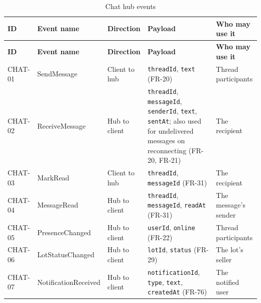 {\small
\begin{longtable}{@{}>{\raggedright\arraybackslash}p{}>{\raggedright\arraybackslash}p{}>{\raggedright\arraybackslash}p{}>{\raggedright\arraybackslash}p{}>{\raggedright\arraybackslash}p{}@{}}
\caption{Chat hub events}\label{tab:chat-hub-events}\\
\toprule
\textbf{ID} & \textbf{Event name} & \textbf{Direction} & \textbf{Payload} & \textbf{Who may use it} \\
\midrule
\endfirsthead
\toprule
\textbf{ID} & \textbf{Event name} & \textbf{Direction} & \textbf{Payload} & \textbf{Who may use it} \\
\midrule
\endhead
CHAT-01 & SendMessage & Client to hub & \texttt{threadId}, \texttt{text} (FR-20) & Thread participants \\
CHAT-02 & ReceiveMessage & Hub to client & \texttt{threadId}, \texttt{messageId}, \texttt{senderId}, \texttt{text}, \texttt{sentAt}; also used for undelivered messages on reconnecting (FR-20, FR-21) & The recipient \\
CHAT-03 & MarkRead & Client to hub & \texttt{threadId}, \texttt{messageId} (FR-31) & The recipient \\
CHAT-04 & MessageRead & Hub to client & \texttt{threadId}, \texttt{messageId}, \texttt{readAt} (FR-31) & The message's sender \\
CHAT-05 & PresenceChanged & Hub to client & \texttt{userId}, \texttt{online} (FR-22) & Thread participants \\
CHAT-06 & LotStatusChanged & Hub to client & \texttt{lotId}, \texttt{status} (FR-29) & The lot's seller \\
CHAT-07 & NotificationReceived & Hub to client & \texttt{notificationId}, \texttt{type}, \texttt{text}, \texttt{createdAt} (FR-76) & The notified user \\
\bottomrule
\end{longtable}
}
